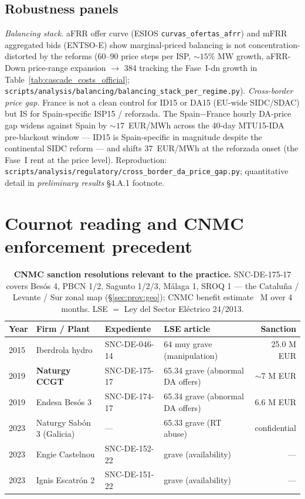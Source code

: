 \documentclass[11pt,a4paper]{article}
\begin{document}
\subsection{Robustness panels}\label{sec:prov:full_cascade:robustness}

\noindent \emph{Balancing stack.} aFRR offer curve (ESIOS \texttt{curvas\_ofertas\_afrr}) and mFRR aggregated bids (ENTSO-E) show marginal-priced balancing is not concentration-distorted by the reforms ($60$--$90$ price steps per ISP, $\sim\!15\%$ MW growth, aFRR-Down price-range expansion  $\to$ 384 tracking the Fase~I-dn growth in Table~\ref{tab:cascade_costs_official}; \texttt{scripts/analysis/balancing/balancing\_stack\_per\_regime.py}).
\emph{Cross-border price gap.} France is not a clean control for ID15 or DA15 (EU-wide SIDC/SDAC) but IS for Spain-specific ISP15 / reforzada. The Spain$-$France hourly DA-price gap widens against Spain by $\sim\!17$~EUR/MWh across the 40-day MTU15-IDA pre-blackout window --- ID15 is Spain-specific in magnitude despite the continental SIDC reform --- and shifts $37$~EUR/MWh at the reforzada onset (the Fase~I rent at the price level). Reproduction: \texttt{scripts/analysis/regulatory/cross\_border\_da\_price\_gap.py}; quantitative detail in \emph{preliminary results} \S 4.A.1 footnote.

\section{Cournot reading and CNMC enforcement precedent}\label{sec:prov:cournot_cnmc}

\begin{table}[H]
\centering\scriptsize
\caption{\textbf{CNMC sanction resolutions relevant to the practice.} SNC-DE-175-17 covers Besós 4, PBCN 1/2, Sagunto 1/2/3, Málaga 1, SROQ 1 --- the Cataluña / Levante / Sur zonal map (\S\ref{sec:prov:geo}); CNMC benefit estimate ~M over 4 months. LSE $=$ Ley del Sector Eléctrico 24/2013.}
\label{tab:cnmc_sanctions}
\setlength{\tabcolsep}{3pt}
\begin{tabular}{@{}l l l l r@{}}
\toprule
Year & Firm / Plant & Expediente & LSE article & Sanction \\
\midrule
2015 & Iberdrola hydro & SNC-DE-046-14 & 64 muy grave (manipulation) & 25.0 M EUR \\
2019 & \textbf{Naturgy CCGT} & SNC-DE-175-17 & 65.34 grave (abnormal DA offers) & $\sim$7 M EUR \\
2019 & Endesa Besós 3 & SNC-DE-174-17 & 65.34 grave (abnormal DA offers) & 6.6 M EUR \\
2023 & Naturgy Sabón 3 (Galicia) & --- & 65.33 grave (RT abuse) & confidential \\
2023 & Engie Castelnou & SNC-DE-152-22 & grave (availability) & --- \\
2023 & Ignis Escatrón 2 & SNC-DE-151-22 & grave (availability) & --- \\
\bottomrule
\end{tabular}
\end{table}
\end{document}
